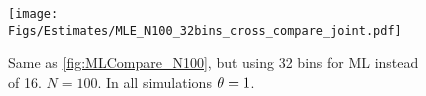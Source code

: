 \documentclass{article}
\begin{document}

\begin{figure}[htp]
\begin{center}
  \texttt{[image: Figs/Estimates/MLE\_N100\_32bins\_cross\_compare\_joint.pdf]}
  \caption{Same as \cref{fig:MLCompare_N100}, but using 32
  bins for ML instead of 16. $N=100$. In all simulations ${\theta} = 1$.}
  \label{fig:MLCompare_N100_32bins}
\end{center}
\end{figure}





\end{document}
